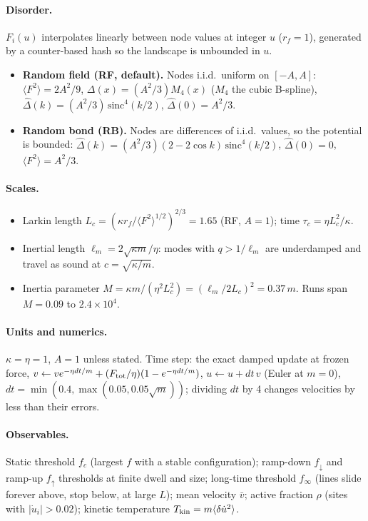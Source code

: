 \documentclass[10pt,a4paper]{article}
\newcommand{\fd}{f_\downarrow}
\newcommand{\fu}{f_\uparrow}
\newcommand{\fcs}{f_c}
\begin{document}
\paragraph{Disorder.} $F_i(u)$ interpolates linearly between node values at integer $u$ ($r_f=1$), generated by a counter-based hash so the landscape is unbounded in $u$.
\begin{itemize}
\item \textbf{Random field (RF, default).} Nodes i.i.d.\ uniform on $[-A,A]$: $\langle F^2\rangle=2A^2/9$, $\Delta(x)=(A^2/3)M_4(x)$ ($M_4$ the cubic B-spline), $\hat\Delta(k)=(A^2/3)\,\mathrm{sinc}^4(k/2)$, $\hat\Delta(0)=A^2/3$.
\item \textbf{Random bond (RB).} Nodes are differences of i.i.d.\ values, so the potential is bounded: $\hat\Delta(k)=(A^2/3)(2-2\cos k)\,\mathrm{sinc}^4(k/2)$, $\hat\Delta(0)=0$, $\langle F^2\rangle=A^2/3$.
\end{itemize}

\paragraph{Scales.}
\begin{itemize}
\item Larkin length $L_c=(\kappa r_f/\langle F^2\rangle^{1/2})^{2/3}=1.65$ (RF, $A=1$); time $\tau_c=\eta L_c^2/\kappa$.
\item Inertial length $\ell_m=2\sqrt{\kappa m}/\eta$: modes with $q>1/\ell_m$ are underdamped and travel as sound at $c=\sqrt{\kappa/m}$.
\item Inertia parameter $M=\kappa m/(\eta^2L_c^2)=(\ell_m/2L_c)^2=0.37\,m$. Runs span $M=0.09$ to $2.4\times10^4$.
\end{itemize}

\paragraph{Units and numerics.} $\kappa=\eta=1$, $A=1$ unless stated. Time step: the exact damped update at frozen force, $v\leftarrow ve^{-\eta dt/m}+(F_{\rm tot}/\eta)(1-e^{-\eta dt/m})$, $u\leftarrow u+dt\,v$ (Euler at $m=0$), $dt=\min(0.4,\max(0.05,0.05\sqrt m))$; dividing $dt$ by 4 changes velocities by less than their errors.

\paragraph{Observables.} Static threshold $\fcs$ (largest $f$ with a stable configuration); ramp-down $\fd$ and ramp-up $\fu$ thresholds at finite dwell and size; long-time threshold $f_\infty$ (lines slide forever above, stop below, at large $L$); mean velocity $\bar v$; active fraction $\rho$ (sites with $|\dot u_i|>0.02$); kinetic temperature $T_{\rm kin}=m\langle\delta\dot u^2\rangle$.
\end{document}
